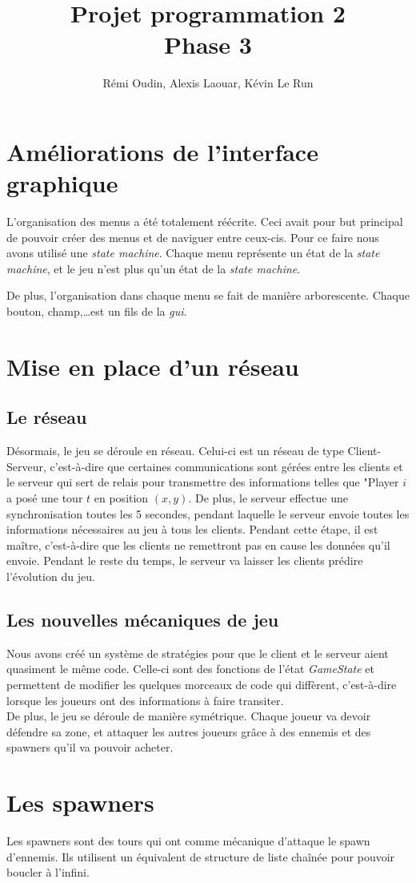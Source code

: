 \documentclass{article}
\title{Projet programmation 2\\Phase 3}
\author{R\'emi Oudin, Alexis Laouar, K\'evin Le Run}
\date{}
\begin{document}
\maketitle
\section{Améliorations de l'interface graphique}

L'organisation des menus a été totalement réécrite. Ceci avait pour but principal
de pouvoir créer des menus et de naviguer entre ceux-cis. Pour ce faire
nous avons utilisé une \emph{state machine}. Chaque menu représente un état de
la \emph{state machine}, et le jeu n'est plus qu'un état de la \emph{state machine}.

De plus, l'organisation dans chaque menu se fait de manière arborescente. Chaque
bouton, champ,\dots est un fils de la \emph{gui}.



\section{Mise en place d'un réseau}

\subsection{Le réseau}
Désormais, le jeu se déroule en réseau. Celui-ci est un réseau de type Client-Serveur,
c'est-à-dire que certaines communications sont gérées entre les clients et le
serveur qui sert de relais pour transmettre des informations telles que "Player $i$
a posé une tour $t$ en position $(x,y)$. De plus, le serveur effectue une synchronisation
toutes les 5 secondes, pendant laquelle le serveur envoie toutes les informations
nécessaires au jeu à tous les clients. Pendant cette étape, il est maître, c'est-à-dire
que les clients ne remettront pas en cause les données qu'il envoie. Pendant le reste du temps,
le serveur va laisser les clients prédire l'évolution du jeu.

\subsection{Les nouvelles mécaniques de jeu}

Nous avons créé un système de stratégies pour que le client et le serveur aient quasiment
le même code. Celle-ci sont des fonctions de l'état \emph{GameState} et permettent
de modifier les quelques morceaux de code qui diffèrent, c'est-à-dire lorsque les
joueurs ont des informations à faire transiter.\\
De plus, le jeu se déroule de manière symétrique. Chaque joueur va devoir défendre
sa zone, et attaquer les autres joueurs grâce à des ennemis et des spawners qu'il va
pouvoir acheter.

\section{Les spawners}

Les spawners sont des tours qui ont comme mécanique d'attaque le spawn d'ennemis.
Ils utilisent un équivalent de structure de liste chaînée pour pouvoir boucler à
l'infini.
\end{document}
